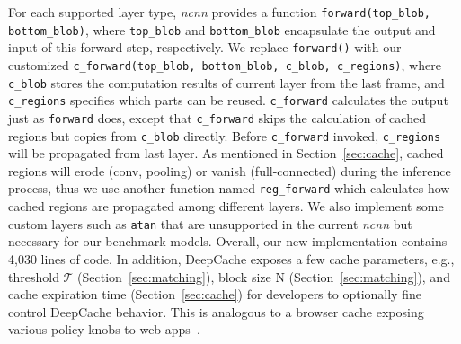 \documentclass[10pt,acmtog]{acmart}
\newcommand{\framework}{DeepCache\xspace}
\newcommand{\sys}{\framework{}}
\begin{document}
For each supported layer type, \emph{ncnn} provides a function \texttt{forward(top\_blob, bottom\_blob)}, where \texttt{top\_blob} and \texttt{bottom\_blob} encapsulate the output and input of this forward step, respectively.
We replace \texttt{forward()} with our customized \texttt{c\_forward(top\_blob, bottom\_blob, c\_blob, c\_regions)}, where \texttt{c\_blob} stores the computation results of current layer from the last frame, and \texttt{c\_regions} specifies which parts can be reused.
\texttt{c\_forward} calculates the output just as \texttt{forward} does, except that \texttt{c\_forward} skips the calculation of cached regions but copies from \texttt{c\_blob} directly.
Before \texttt{c\_forward} invoked, \texttt{c\_regions} will be propagated from last layer.
As mentioned in Section~\ref{sec:cache}, cached regions will erode (conv, pooling) or vanish  (full-connected) during the inference process, thus we use another function named \texttt{reg\_forward} which calculates how cached regions are propagated among different layers.
We also implement some custom layers such as \texttt{atan} that are unsupported in the current \emph{ncnn} but necessary for our benchmark models. 
Overall, our new implementation contains 4,030 lines of code. 
In addition, \sys{} exposes a few cache parameters, e.g., threshold $\mathcal{T}$ (Section~\ref{sec:matching}), block size N (Section~\ref{sec:matching}), and cache expiration time (Section~\ref{sec:cache}) for developers to optionally fine control \framework behavior.
This is analogous to a browser cache exposing various policy knobs to web apps~\cite{webcache}.

\end{document}
